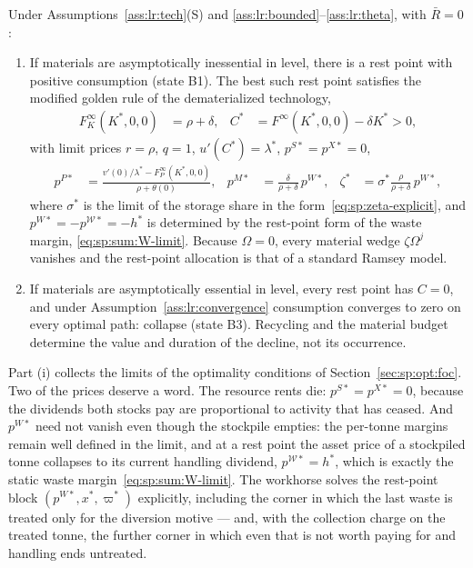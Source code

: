 \begin{proposition}[survival dichotomy, stationary technology, $\bar R=0$]\label{prop:lr:dichotomy}
Under Assumptions~\ref{ass:lr:tech}(S) and \ref{ass:lr:bounded}--\ref{ass:lr:theta}, with $\bar R=0$:
\begin{enumerate}
    \item If materials are asymptotically inessential in level, there is a rest point with positive consumption (state B1). The best such rest point satisfies the modified golden rule of the dematerialized technology,
    \begin{align}
    F^\infty_K\left(K^*,0,0\right) &= \rho+\delta,
    &
    C^* &= F^\infty\left(K^*,0,0\right)-\delta K^*>0,
    \label{eq:sp:lr:mgr}
    \end{align}
    with limit prices $r=\rho$, $q=1$, $u'\left(C^*\right)=\lambda^*$, $p^{S*}=p^{X*}=0$,
    \begin{align}
    p^{P*} &= \frac{v'\left(0\right)/\lambda^*-F^\infty_P\left(K^*,0,0\right)}{\rho+\theta\left(0\right)},
    &
    p^{M*} &= \frac{\delta}{\rho+\delta}\,p^{W*},
    &
    \zeta^* &= \sigma^*\frac{\rho}{\rho+\delta}\,p^{W*},
    \label{eq:sp:lr:restprices}
    \end{align}
    where $\sigma^*$ is the limit of the storage share in the form~\eqref{eq:sp:zeta-explicit}, and $p^{W*}=-p^{\mathcal W*}=-h^*$ is determined by the rest-point form of the waste margin, \eqref{eq:sp:sum:W-limit}. Because $\Omega=0$, every material wedge $\zeta\Omega^j$ vanishes and the rest-point allocation is that of a standard Ramsey model.
    \item If materials are asymptotically essential in level, every rest point has $C=0$, and under Assumption~\ref{ass:lr:convergence} consumption converges to zero on every optimal path: collapse (state B3). Recycling and the material budget determine the value and duration of the decline, not its occurrence.
\end{enumerate}
\end{proposition}

Part (i) collects the limits of the optimality conditions of Section~\ref{sec:sp:opt:foc}. Two of the prices deserve a word. The resource rents die: $p^{S*}=p^{X*}=0$, because the dividends both stocks pay are proportional to activity that has ceased. And $p^{W*}$ need not vanish even though the stockpile empties: the per-tonne margins remain well defined in the limit, and at a rest point the asset price of a stockpiled tonne collapses to its current handling dividend, $p^{\mathcal W*}=h^*$, which is exactly the static waste margin~\eqref{eq:sp:sum:W-limit}. The workhorse solves the rest-point block $\left(p^{W*},x^*,\varpi^*\right)$ explicitly, including the corner in which the last waste is treated only for the diversion motive --- and, with the collection charge on the treated tonne, the further corner in which even that is not worth paying for and handling ends untreated.

